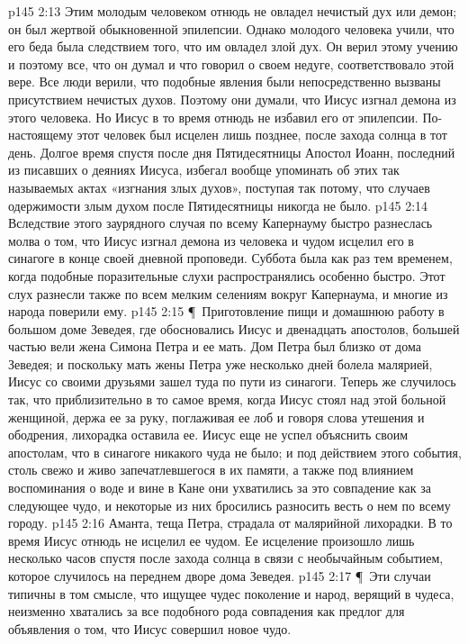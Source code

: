 \vs p145 2:13 Этим молодым человеком отнюдь не овладел нечистый дух или демон; он был жертвой обыкновенной эпилепсии. Однако молодого человека учили, что его беда была следствием того, что им овладел злой дух. Он верил этому учению и поэтому все, что он думал и что говорил о своем недуге, соответствовало этой вере. Все люди верили, что подобные явления были непосредственно вызваны присутствием нечистых духов. Поэтому они думали, что Иисус изгнал демона из этого человека. Но Иисус в то время отнюдь не избавил его от эпилепсии. По\hyp{}настоящему этот человек был исцелен лишь позднее, после захода солнца в тот день. Долгое время спустя после дня Пятидесятницы Апостол Иоанн, последний из писавших о деяниях Иисуса, избегал вообще упоминать об этих так называемых актах «изгнания злых духов», поступая так потому, что случаев одержимости злым духом после Пятидесятницы никогда не было.
\vs p145 2:14 Вследствие этого заурядного случая по всему Капернауму быстро разнеслась молва о том, что Иисус изгнал демона из человека и чудом исцелил его в синагоге в конце своей дневной проповеди. Суббота была как раз тем временем, когда подобные поразительные слухи распространялись особенно быстро. Этот слух разнесли также по всем мелким селениям вокруг Капернаума, и многие из народа поверили ему.
\vs p145 2:15 \P\ Приготовление пищи и домашнюю работу в большом доме Зеведея, где обосновались Иисус и двенадцать апостолов, большей частью вели жена Симона Петра и ее мать. Дом Петра был близко от дома Зеведея; и поскольку мать жены Петра уже несколько дней болела малярией, Иисус со своими друзьями зашел туда по пути из синагоги. Теперь же случилось так, что приблизительно в то самое время, когда Иисус стоял над этой больной женщиной, держа ее за руку, поглаживая ее лоб и говоря слова утешения и ободрения, лихорадка оставила ее. Иисус еще не успел объяснить своим апостолам, что в синагоге никакого чуда не было; и под действием этого события, столь свежо и живо запечатлевшегося в их памяти, а также под влиянием воспоминания о воде и вине в Кане они ухватились за это совпадение как за следующее чудо, и некоторые из них бросились разносить весть о нем по всему городу.
\vs p145 2:16 Аманта, теща Петра, страдала от малярийной лихорадки. В то время Иисус отнюдь не исцелил ее чудом. Ее исцеление произошло лишь несколько часов спустя после захода солнца в связи с необычайным событием, которое случилось на переднем дворе дома Зеведея.
\vs p145 2:17 \P\ Эти случаи типичны в том смысле, что ищущее чудес поколение и народ, верящий в чудеса, неизменно хватались за все подобного рода совпадения как предлог для объявления о том, что Иисус совершил новое чудо.
